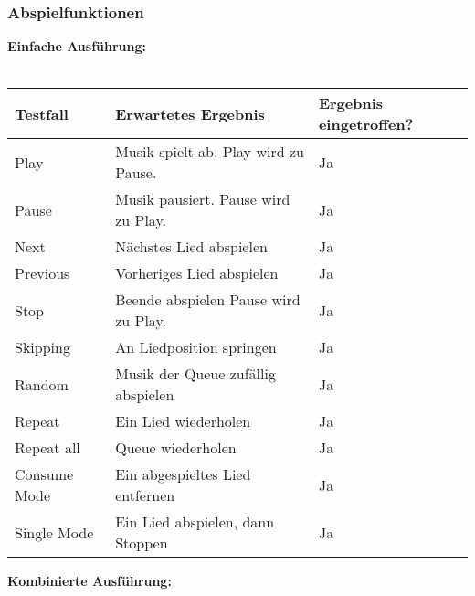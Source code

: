 \subsubsection{Abspielfunktionen}
\textbf{Einfache Ausführung:}\ \\ \\
\begin{tabularx}{\textwidth}{|X|X|l|}
    \hline
    \textbf{Testfall} & \textbf{Erwartetes Ergebnis} & \textbf{Ergebnis eingetroffen?}\\
    \hline
    Play & Musik spielt ab. Play wird zu Pause. & Ja\\
    \hline
    Pause & Musik pausiert. Pause wird zu Play. & Ja\\
    \hline
    Next & Nächstes Lied abspielen & Ja\\
    \hline
    Previous & Vorheriges Lied abspielen & Ja\\
    \hline
    Stop & Beende abspielen Pause wird zu Play. & Ja\\
    \hline
    Skipping & An Liedposition springen & Ja\\
    \hline
    Random & Musik der Queue zufällig abspielen & Ja\\
    \hline 
    Repeat & Ein Lied wiederholen & Ja\\
    \hline
    Repeat all & Queue wiederholen & Ja\\
    \hline
    Consume Mode & Ein abgespieltes Lied entfernen & Ja\\
    \hline
    Single Mode & Ein Lied abspielen, dann Stoppen & Ja\\
    \hline
\end{tabularx}
\newpage
\textbf{Kombinierte Ausführung:}\ \\ \\
